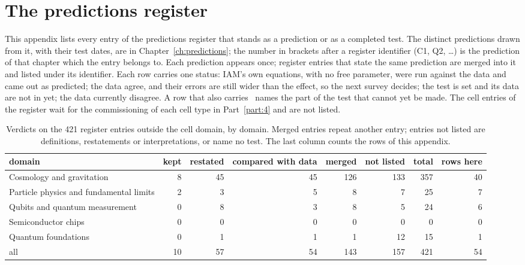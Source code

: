 \chapter{The predictions register}\label{app:register}

This appendix lists every entry of the predictions register that stands as a prediction or as a completed test.
The distinct predictions drawn from it, with their test dates, are in Chapter~\ref{ch:predictions}; the number in
brackets after a register identifier (C1, Q2, \ldots) is the prediction of that chapter which the entry belongs to.
Each prediction appears once; register entries that state the same prediction are merged into it and listed under its
identifier. Each row carries one status: \Spassed{} IAM's own equations, with no free parameter, were run against the data and
came out as predicted; \Sprecision{} the data agree, and their errors are still wider than the effect, so the next survey decides;
\Spending{} the test is set and its data are not in yet; \Stension{} the data currently disagree. A row that also
carries \openprob\ names the part of the test that cannot yet be made. The cell entries of the register wait for the
commissioning of each cell type in Part~\ref{part:4} and are not listed.

\begin{table}[htbp]\centering\small
\caption{Verdicts on the 421 register entries outside the cell domain, by domain. Merged entries repeat another entry; entries not listed are definitions, restatements or interpretations, or name no test. The last column counts the rows of this appendix. \observed}\label{tab:register_counts}
\begin{adjustbox}{max width=\textwidth}
\begin{tabular}{@{}lrrrrrrr@{}}\toprule
domain & kept & restated & compared with data & merged & not listed & total & rows here\\\midrule
Cosmology and gravitation & 8 & 45 & 45 & 126 & 133 & 357 & 40\\
Particle physics and fundamental limits & 2 & 3 & 5 & 8 & 7 & 25 & 7\\
Qubits and quantum measurement & 0 & 8 & 3 & 8 & 5 & 24 & 6\\
Semiconductor chips & 0 & 0 & 0 & 0 & 0 & 0 & 0\\
Quantum foundations & 0 & 1 & 1 & 1 & 12 & 15 & 1\\
\midrule all & 10 & 57 & 54 & 143 & 157 & 421 & 54\\\bottomrule
\end{tabular}
\end{adjustbox}\end{table}


